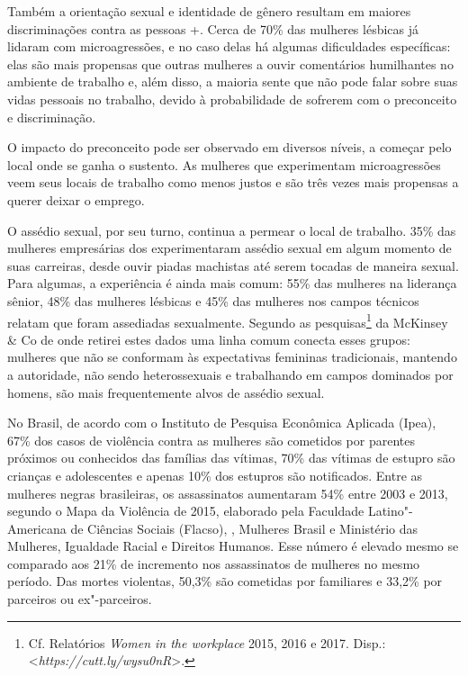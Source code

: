 Também a orientação sexual e identidade de gênero resultam em maiores
discriminações contra as pessoas +. Cerca de 70\% das mulheres
lésbicas já lidaram com microagressões, e no caso delas há algumas
dificuldades específicas: elas são mais propensas que outras mulheres a
ouvir comentários humilhantes no ambiente de trabalho e, além disso, a
maioria sente que não pode falar sobre suas vidas pessoais no trabalho,
devido à probabilidade de sofrerem com o preconceito e discriminação.

O impacto do preconceito pode ser observado em diversos níveis, a
começar pelo local onde se ganha o sustento. As mulheres que
experimentam microagressões veem seus locais de trabalho como menos
justos e são três vezes mais propensas a querer deixar o emprego.

O assédio sexual, por seu turno, continua a permear o local de trabalho.
35\% das mulheres empresárias dos  experimentaram assédio sexual em
algum momento de suas carreiras, desde ouvir piadas machistas até serem
tocadas de maneira sexual. Para algumas, a experiência é ainda mais
comum: 55\% das mulheres na liderança sênior, 48\% das mulheres lésbicas
e 45\% das mulheres nos campos técnicos relatam que foram assediadas
sexualmente. Segundo as pesquisas\footnote{Cf. Relatórios \emph{Women in
  the workplace} 2015, 2016 e 2017. Disp.:
  \textless{}\emph{https://cutt.ly/wysu0nR}\textgreater{}.} da McKinsey \& Co de onde
retirei estes dados uma linha comum conecta esses grupos: mulheres que
não se conformam às expectativas femininas tradicionais, mantendo a
autoridade, não sendo heterossexuais e trabalhando em campos dominados
por homens, são mais frequentemente alvos de assédio sexual.

No Brasil, de acordo com o Instituto de Pesquisa Econômica Aplicada
(Ipea), 67\% dos casos de violência contra as mulheres são cometidos por
parentes próximos ou conhecidos das famílias das vítimas, 70\% das
vítimas de estupro são crianças e adolescentes e apenas 10\% dos
estupros são notificados. Entre as mulheres negras brasileiras, os
assassinatos aumentaram 54\% entre 2003 e 2013, segundo o Mapa da
Violência de 2015, elaborado pela Faculdade Latino"-Americana de Ciências
Sociais (Flacso), ,  Mulheres Brasil e Ministério das Mulheres,
Igualdade Racial e Direitos Humanos. Esse número é elevado mesmo se
comparado aos 21\% de incremento nos assassinatos de mulheres no mesmo
período. Das mortes violentas, 50,3\% são cometidas por familiares e
33,2\% por parceiros ou ex"-parceiros.

